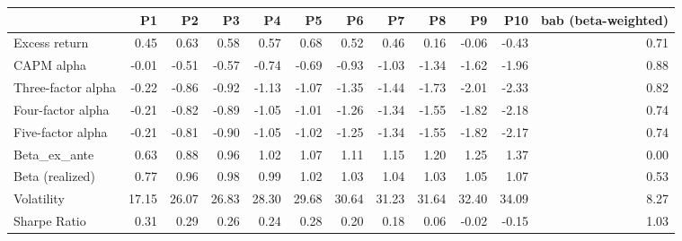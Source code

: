 \begin{tabular}{lrrrrrrrrrrr}
\toprule
{} &     P1 &     P2 &     P3 &     P4 &     P5 &     P6 &     P7 &     P8 &     P9 &    P10 &  bab (beta-weighted) \\
\midrule
Excess return      &   0.45 &   0.63 &   0.58 &   0.57 &   0.68 &   0.52 &   0.46 &   0.16 &  -0.06 &  -0.43 &                 0.71 \\
CAPM alpha         &  -0.01 &  -0.51 &  -0.57 &  -0.74 &  -0.69 &  -0.93 &  -1.03 &  -1.34 &  -1.62 &  -1.96 &                 0.88 \\
Three-factor alpha &  -0.22 &  -0.86 &  -0.92 &  -1.13 &  -1.07 &  -1.35 &  -1.44 &  -1.73 &  -2.01 &  -2.33 &                 0.82 \\
Four-factor alpha  &  -0.21 &  -0.82 &  -0.89 &  -1.05 &  -1.01 &  -1.26 &  -1.34 &  -1.55 &  -1.82 &  -2.18 &                 0.74 \\
Five-factor alpha  &  -0.21 &  -0.81 &  -0.90 &  -1.05 &  -1.02 &  -1.25 &  -1.34 &  -1.55 &  -1.82 &  -2.17 &                 0.74 \\
Beta\_ex\_ante       &   0.63 &   0.88 &   0.96 &   1.02 &   1.07 &   1.11 &   1.15 &   1.20 &   1.25 &   1.37 &                 0.00 \\
Beta (realized)    &   0.77 &   0.96 &   0.98 &   0.99 &   1.02 &   1.03 &   1.04 &   1.03 &   1.05 &   1.07 &                 0.53 \\
Volatility         &  17.15 &  26.07 &  26.83 &  28.30 &  29.68 &  30.64 &  31.23 &  31.64 &  32.40 &  34.09 &                 8.27 \\
Sharpe Ratio       &   0.31 &   0.29 &   0.26 &   0.24 &   0.28 &   0.20 &   0.18 &   0.06 &  -0.02 &  -0.15 &                 1.03 \\
\bottomrule
\end{tabular}
